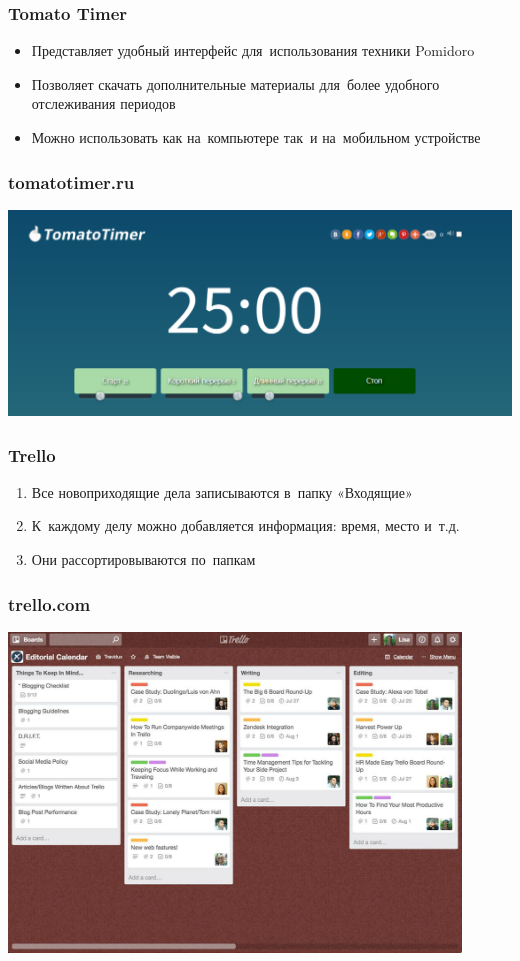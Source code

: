\documentclass{../industrial-development}
\begin{document}
\begin{frame} \frametitle{Tomato Timer}
  \begin{itemize}
  \item Представляет удобный интерфейс для~использования техники Pomidoro
  \item Позволяет скачать дополнительные материалы для~более удобного отслеживания периодов
  \item Можно использовать как на~компьютере так~и на~мобильном устройстве
  \end{itemize}
\end{frame}

\begin{frame} \frametitle{tomatotimer.ru}
\centerline{\includegraphics[width=1\textwidth]{tomatotimer.pdf}}
\end{frame}

\begin{frame} \frametitle{Trello}
  \begin{enumerate}
  \item Все новоприходящие дела записываются в~папку «Входящие»
  \item К~каждому делу можно добавляется информация: время, место и~т.д.
  \item Они рассортировываются по~папкам
  \end{enumerate}
\end{frame}

\begin{frame} \frametitle{trello.com}
\centerline{\includegraphics[width=0.9\textwidth]{trello.pdf}}
\end{frame}
\end{document}
